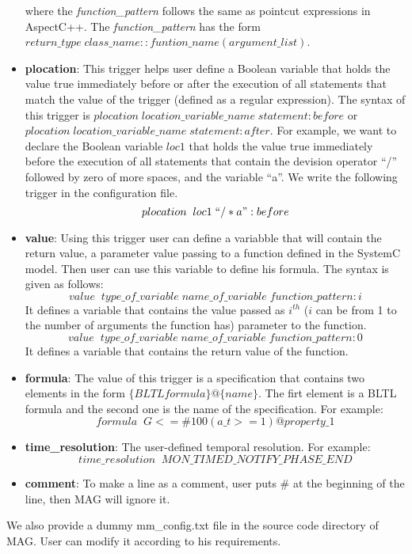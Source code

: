 \documentclass{llncs}
\begin{document}
\begin{itemize}
where the \textit{function\_pattern} follows the same as pointcut expressions in AspectC++. The \textit{function\_pattern} has the form $return\_type \; class\_name::funtion\_name(argument\_list)$.
\item \textbf{plocation}: This trigger helps user define a Boolean variable that holds the value true immediately before or after the execution of all statements that match the value of the trigger (defined as a regular expression). The syntax of this trigger is $plocation \; location\_variable\_name \; statement:before$ or $plocation \; location\_variable\_name \; statement:after$. For example, we want to declare the Boolean variable $loc1$ that holds the value true immediately before the execution of all statements that contain the devision operator ``/'' followed by zero of more spaces, and the variable ``a''. We write the following trigger in the configuration file.
\begin{displaymath}
plocation \; \; loc1  \; ``/ *a":before
\end{displaymath}
\item \textbf{value}: Using this trigger user can define a variabble that will contain the return value, a parameter value passing to a function defined in the SystemC model. Then user can use this variable to define his formula. The syntax is given as follows:
\begin{displaymath}
value \; \; type\_of\_variable \; name\_of\_variable \; function\_pattern:i
\end{displaymath}
It defines a variable that contains the value passed as $i^{th}$ ($i$ can be from 1 to the number of arguments the function has) parameter to the function.
\begin{displaymath}
value \; \; type\_of\_variable \; name\_of\_variable \; function\_pattern:0
\end{displaymath} 
It defines a variable that contains the return value of the function.
\item \textbf{formula}: The value of this trigger is a specification that contains two elements in the form $\{BLTL formula\}@\{name\}$. The firt element is a BLTL formula and the second one is the name of the specification. For example:
\begin{displaymath}
formula \; \; G <= \#100 (a\_t >= 1) @ property\_1
\end{displaymath}
\item \textbf{time\_resolution}: The user-defined temporal resolution. For example:
\begin{displaymath}
time\_resolution \; \; MON\_TIMED\_NOTIFY\_PHASE\_END
\end{displaymath}
\item \textbf{comment}: To make a line as a comment, user puts \# at the beginning of the line, then MAG will ignore it.
\end{itemize}
We also provide a dummy mm\_config.txt file in the source code directory of MAG. User can modify it according to his requirements.
\end{document}
